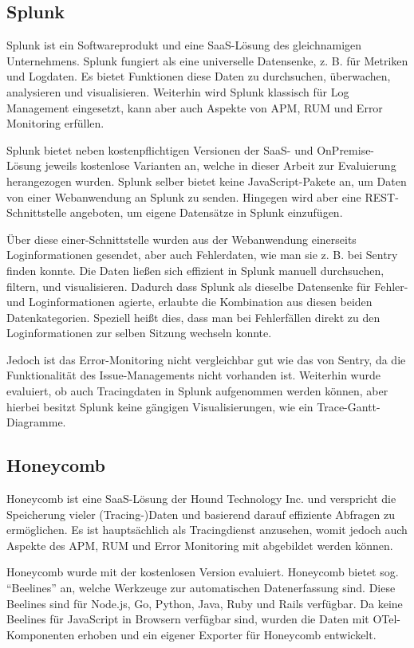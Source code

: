 \subsection{Splunk}

Splunk \cite{Splunk} ist ein Softwareprodukt und eine SaaS-Lösung des gleichnamigen Unternehmens. Splunk fungiert als eine universelle Datensenke, z. B. für Metriken und Logdaten. Es bietet Funktionen diese Daten zu durchsuchen, überwachen, analysieren und visualisieren. Weiterhin wird Splunk klassisch für Log Management eingesetzt, kann aber auch Aspekte von APM, RUM und Error Monitoring erfüllen.

Splunk bietet neben kostenpflichtigen Versionen der SaaS- und OnPremise-Lösung jeweils kostenlose Varianten an, welche in dieser Arbeit zur Evaluierung herangezogen wurden. Splunk selber bietet keine JavaScript-Pakete an, um Daten von einer Webanwendung an Splunk zu senden. Hingegen wird aber eine REST-Schnittstelle angeboten, um eigene Datensätze in Splunk einzufügen.

Über diese einer-Schnittstelle wurden aus der Webanwendung einerseits Loginformationen gesendet, aber auch Fehlerdaten, wie man sie z. B. bei Sentry finden konnte. Die Daten ließen sich effizient in Splunk manuell durchsuchen, filtern, und visualisieren. Dadurch dass Splunk als dieselbe Datensenke für Fehler- und Loginformationen agierte, erlaubte die Kombination aus diesen beiden Datenkategorien. Speziell heißt dies, dass man bei Fehlerfällen direkt zu den Loginformationen zur selben Sitzung wechseln konnte.

Jedoch ist das Error-Monitoring nicht vergleichbar gut wie das von Sentry, da die Funktionalität des Issue-Managements nicht vorhanden ist. Weiterhin wurde evaluiert, ob auch Tracingdaten in Splunk aufgenommen werden können, aber hierbei besitzt Splunk keine gängigen Visualisierungen, wie ein Trace-Gantt-Diagramme.

\subsection{Honeycomb}

Honeycomb \cite{Honeycomb} ist eine SaaS-Lösung der Hound Technology Inc. und verspricht die Speicherung vieler (Tracing-)Daten und basierend darauf effiziente Abfragen zu ermöglichen. Es ist hauptsächlich als Tracingdienst anzusehen, womit jedoch auch Aspekte des APM, RUM und Error Monitoring mit abgebildet werden können.

Honeycomb wurde mit der kostenlosen Version evaluiert. Honeycomb bietet sog. \enquote{Beelines} an, welche Werkzeuge zur automatischen Datenerfassung sind. Diese Beelines sind für Node.js, Go, Python, Java, Ruby und Rails verfügbar. Da keine Beelines für JavaScript in Browsern verfügbar sind, wurden die Daten mit OTel-Komponenten erhoben und ein eigener Exporter für Honeycomb entwickelt.

